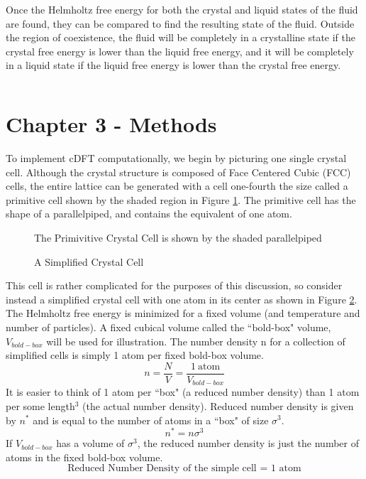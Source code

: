 \documentclass[double,12pt]{beavtex}
\begin{document}
Once the Helmholtz free energy for both the crystal and liquid states of the fluid are found, they can be compared to find the resulting state of the fluid. Outside the region of coexistence, the fluid will be completely in a crystalline state if the crystal free energy is lower than the liquid free energy, and it will be completely in a liquid state if the liquid free energy is lower than the crystal free energy. 

\[{}\]
\section{Chapter 3 - Methods}

To implement cDFT computationally, we begin by picturing one single crystal cell. Although the crystal structure is composed of Face Centered Cubic (FCC) cells, the entire lattice can be generated with a cell one-fourth the size called a primitive cell shown by the shaded region in Figure \ref{fig:primitivecell}. The primitive cell has the shape of a parallelpiped, and contains the equivalent of one atom.
 
  \begin{figure}[h!]
    \centering
    \caption{The Primivitive Crystal Cell is shown by the shaded parallelpiped}
    \label{fig:primitivecell}
  \end{figure}


  \begin{figure}[h!]
    \centering
    \caption{A Simplified Crystal Cell}
    \label{fig:simplecell}
  \end{figure}


This cell is rather complicated for the purposes of this discussion, so consider instead a simplified crystal cell with one atom in its center as shown in Figure \ref{fig:simplecell}. 
The Helmholtz free energy is minimized for a fixed volume (and temperature and number of particles).  A fixed cubical volume called the ``bold-box" volume, $V_{bold-box}$ will be used for illustration. The number density n for a collection of simplified cells is simply 1 atom per fixed bold-box volume.
\begin{displaymath}{n = \frac{N}{V}=\frac{1~\text{atom}}{V_{bold-box}}}\end{displaymath} It is easier to think of 1 atom per ``box" (a reduced number density) than 1 atom per some length$^3$ (the actual number density). Reduced number density is given by $n^*$ and is equal to the number of atoms in a ``box" of size $\sigma^3$.
\begin{displaymath}{n^*=n\sigma^3}\end{displaymath} If $V_{bold-box}$  has a volume of $\sigma^3$, the reduced number density is just the number of atoms in the fixed bold-box volume. 
\begin{displaymath}\text{Reduced Number Density of the simple cell = 1 atom}\end{displaymath} 
\end{document}
